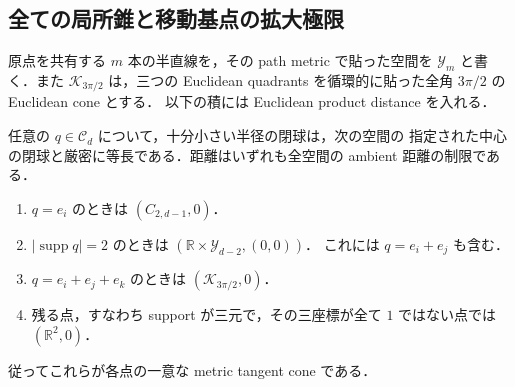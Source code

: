 \subsection{全ての局所錐と移動基点の拡大極限}

原点を共有する $m$ 本の半直線を，その path metric で貼った空間を
$\mathcal Y_m$ と書く．また $\mathcal K_{3\pi/2}$ は，三つの Euclidean quadrants
を循環的に貼った全角 $3\pi/2$ の Euclidean cone とする．
以下の積には Euclidean product distance を入れる．

\begin{proposition}
\label{topo:cubical-local-models}
任意の $q\in\mathcal C_d$ について，十分小さい半径の閉球は，次の空間の
指定された中心の閉球と厳密に等長である．距離はいずれも全空間の ambient 距離の制限である．
\begin{enumerate}
\item $q=e_i$ のときは $(C_{2,d-1},0)$．
\item $|\operatorname{supp}q|=2$ のときは
      $(\mathbb R\times\mathcal Y_{d-2},(0,0))$．
      これには $q=e_i+e_j$ も含む．
\item $q=e_i+e_j+e_k$ のときは $(\mathcal K_{3\pi/2},0)$．
\item 残る点，すなわち support が三元で，その三座標が全て $1$ ではない点では
      $(\mathbb R^2,0)$．
\end{enumerate}
従ってこれらが各点の一意な metric tangent cone である．
\end{proposition}
